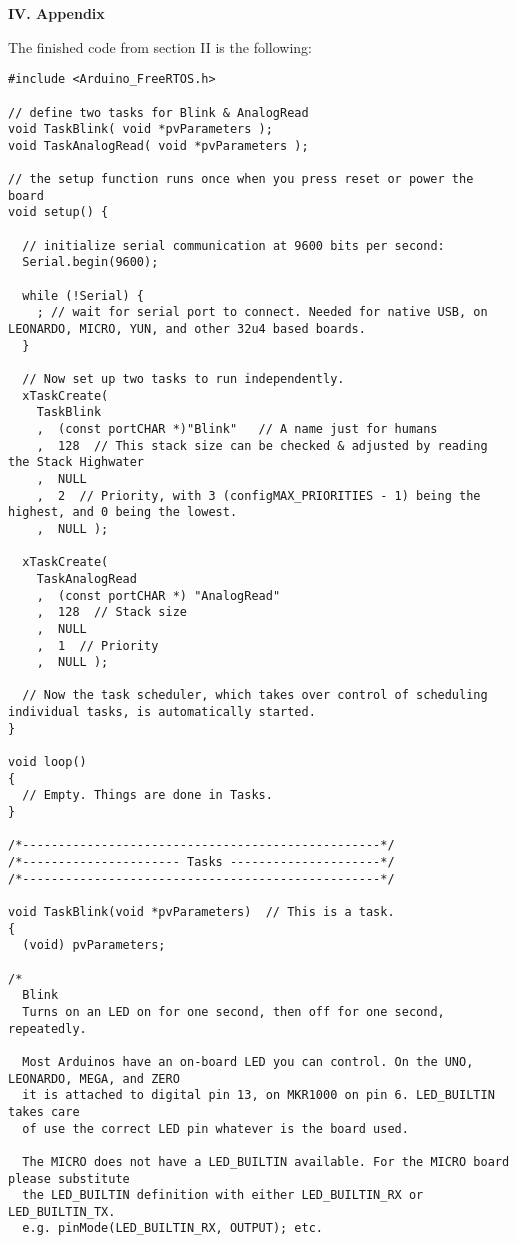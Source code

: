 \documentclass[a4paper,12pt]{report}
\begin{document}
\pagebreak
\noindent
\textbf{IV. Appendix}

\noindent
The finished code from section II is the following:
\begin{lstlisting}[style=CStyle]
#include <Arduino_FreeRTOS.h>

// define two tasks for Blink & AnalogRead
void TaskBlink( void *pvParameters );
void TaskAnalogRead( void *pvParameters );

// the setup function runs once when you press reset or power the board
void setup() {
  
  // initialize serial communication at 9600 bits per second:
  Serial.begin(9600);
  
  while (!Serial) {
    ; // wait for serial port to connect. Needed for native USB, on LEONARDO, MICRO, YUN, and other 32u4 based boards.
  }

  // Now set up two tasks to run independently.
  xTaskCreate(
    TaskBlink
    ,  (const portCHAR *)"Blink"   // A name just for humans
    ,  128  // This stack size can be checked & adjusted by reading the Stack Highwater
    ,  NULL
    ,  2  // Priority, with 3 (configMAX_PRIORITIES - 1) being the highest, and 0 being the lowest.
    ,  NULL );

  xTaskCreate(
    TaskAnalogRead
    ,  (const portCHAR *) "AnalogRead"
    ,  128  // Stack size
    ,  NULL
    ,  1  // Priority
    ,  NULL );

  // Now the task scheduler, which takes over control of scheduling individual tasks, is automatically started.
}

void loop()
{
  // Empty. Things are done in Tasks.
}

/*--------------------------------------------------*/
/*---------------------- Tasks ---------------------*/
/*--------------------------------------------------*/

void TaskBlink(void *pvParameters)  // This is a task.
{
  (void) pvParameters;

/*
  Blink
  Turns on an LED on for one second, then off for one second, repeatedly.

  Most Arduinos have an on-board LED you can control. On the UNO, LEONARDO, MEGA, and ZERO 
  it is attached to digital pin 13, on MKR1000 on pin 6. LED_BUILTIN takes care 
  of use the correct LED pin whatever is the board used.
  
  The MICRO does not have a LED_BUILTIN available. For the MICRO board please substitute
  the LED_BUILTIN definition with either LED_BUILTIN_RX or LED_BUILTIN_TX.
  e.g. pinMode(LED_BUILTIN_RX, OUTPUT); etc.
  

\end{lstlisting}
\end{document}
